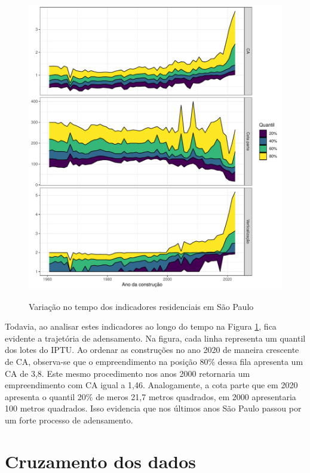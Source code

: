 \begin{figure}[h]
    \centering
    \caption{Variação no tempo dos indicadores residenciais em São Paulo}
    \includegraphics[width = \linewidth]{imagens/indicadores_tempo.pdf}
    \label{fig:indicadores-tempo}
\end{figure}

Todavia, ao analisar estes indicadores ao longo do tempo na Figura \ref{fig:indicadores-tempo}, fica evidente a trajetória de adensamento. Na figura, cada linha representa um quantil dos lotes do IPTU. Ao ordenar as construções no ano 2020 de maneira crescente de CA, observa-se que o empreendimento na posição 80\% dessa fila apresenta um CA de 3,8. Este mesmo procedimento nos anos 2000 retornaria um empreendimento com CA igual a 1,46. Analogamente, a cota parte que em 2020 apresenta o quantil 20\% de meros 21,7 metros quadrados, em 2000 apresentaria 100 metros quadrados. Isso evidencia que nos últimos anos São Paulo passou por um forte processo de adensamento.

\section*{Cruzamento dos dados}

